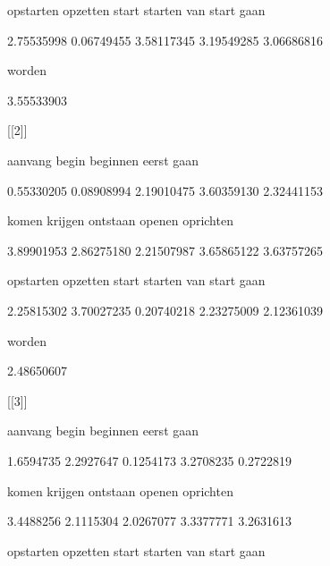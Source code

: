      opstarten       opzetten          start        starten van start gaan 



    2.75535998     0.06749455     3.58117345     3.19549285     3.06686816 



        worden 



    3.55533903 



[[2]]



       aanvang          begin       beginnen          eerst           gaan 



    0.55330205     0.08908994     2.19010475     3.60359130     2.32441153 



         komen        krijgen       ontstaan         openen      oprichten 



    3.89901953     2.86275180     2.21507987     3.65865122     3.63757265 



     opstarten       opzetten          start        starten van start gaan 



    2.25815302     3.70027235     0.20740218     2.23275009     2.12361039 



        worden 



    2.48650607 



[[3]]



       aanvang          begin       beginnen          eerst           gaan 



     1.6594735      2.2927647      0.1254173      3.2708235      0.2722819 



         komen        krijgen       ontstaan         openen      oprichten 



     3.4488256      2.1115304      2.0267077      3.3377771      3.2631613 



     opstarten       opzetten          start        starten van start gaan 



